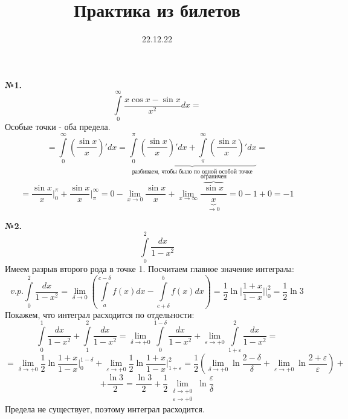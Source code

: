 \documentclass[a4paper]{article}
\author{}
\title{Практика из билетов}
\date{22.12.22}
\begin{document}
\maketitle
\textbf{№1.}
$$\int\limits_{0}^{\infty}\frac{x\cos x-\sin x}{x^2}dx = $$ 
Особые точки - оба предела. 
$$= \int\limits_{0}^{\infty}\left( \frac{\sin x}{x} \right)'dx = 
\underbrace{
\int\limits_{0}^{\pi} \left( \frac{\sin x}{x} \right)'dx + 
\int\limits_{\pi}^{\infty} \left( \frac{\sin x}{x} \right)'dx}_\text{разбиваем,
чтобы было по одной особой точке} = 
$$
$$= \frac{\sin x}{x}\bigg|^\pi_0+\frac{\sin x}{x}\bigg|^\infty_\pi = 
0 - \lim\limits_{x \to 0}\frac{\sin x}{x}+\lim\limits_{x \to \infty} 
\frac{ \overbrace{\sin x}^\text{ограничен} }{\underbrace{x}_{\to 0}}
= 0-1+0 = -1 $$

\textbf{№2.} $$\int\limits_{0}^{2} \frac{dx}{1-x^2}$$ 
Имеем разрыв второго рода в точке 1. Посчитаем главное значение интеграла:
$$v.p.\int\limits_{0}^{2} \frac{dx}{1-x^2}=
\lim\limits_{\delta \to 0} \left( \int\limits_{a}^{c-\delta}f(x)dx -
\int\limits_{c+\delta}^{b}f(x)dx\right) = \frac{1}{2}\ln\bigg|
\frac{1+x}{1-x}\bigg|\Big|^2_0 = \frac{1}{2}\ln3
$$
Покажем, что интеграл расходится по отдельности:
$$\int\limits_{0}^{1}\frac{dx}{1-x^2}+\int\limits_{1}^{2}\frac{dx}{1-x^2}=
\lim\limits_{\delta \to +0} \int\limits_{0}^{1-\delta}\frac{dx}{1-x^2}+
\lim\limits_{\varepsilon\to +0} 
\int\limits_{1+\varepsilon}^{2}\frac{dx}{1-x^2}=
$$
$$=\lim\limits_{\delta \to +0}\frac{1}{2}\ln \frac{1+x}{1-x}\Big|^{1-\delta}_0
+\lim\limits_{\varepsilon \to +0}\frac{1}{2}\ln \frac{1+x}{1-x}
\Big|^2_{1+\varepsilon}=
\frac{1}{2}\left( \lim\limits_{\delta \to +0}\ln \frac{2-\delta}{\delta}+
\lim\limits_{\varepsilon \to +0}\ln \frac{2+\varepsilon}{\varepsilon}
\right)+
$$
$$+\frac{\ln3}{2}=\frac{\ln3}{2}+\frac{1}{2}
\lim\limits_{\substack{\delta \to+0\\
\varepsilon \to +0}} \ln\frac{\varepsilon}{\delta}$$
Предела не существует, поэтому интеграл расходится.
\end{document}
